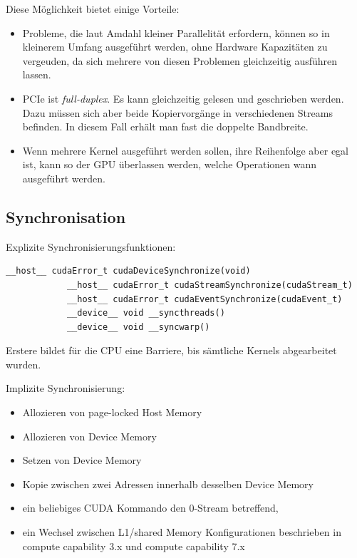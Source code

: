 		Diese Möglichkeit bietet einige Vorteile:
		\begin{itemize}
		\item Probleme, die laut Amdahl kleiner Parallelität erfordern, können so in kleinerem Umfang ausgeführt werden, ohne Hardware Kapazitäten zu vergeuden, da sich mehrere von diesen Problemen gleichzeitig ausführen lassen.
		\item PCIe ist \textit{full-duplex}. Es kann gleichzeitig gelesen und geschrieben werden. Dazu müssen sich aber beide Kopiervorgänge in verschiedenen Streams befinden. In diesem Fall erhält man fast die doppelte Bandbreite.
		\item Wenn mehrere \Gls{Kernel} ausgeführt werden sollen, ihre Reihenfolge aber egal ist, kann so der GPU überlassen werden, welche Operationen wann ausgeführt werden.
		\end{itemize}
		
		
		\subsection{Synchronisation}\label{sync}
		Explizite Synchronisierungsfunktionen:
		
		\begin{lstlisting}[caption=Explizite Synchronisierung]
			__host__ cudaError_t cudaDeviceSynchronize(void)
			__host__ cudaError_t cudaStreamSynchronize(cudaStream_t)
			__host__ cudaError_t cudaEventSynchronize(cudaEvent_t)	
			__device__ void __syncthreads()
			__device__ void __syncwarp()
		\end{lstlisting}
		Erstere bildet für die CPU eine Barriere, bis sämtliche Kernels abgearbeitet wurden.
		
		Implizite Synchronisierung:
		\begin{itemize}
        	    \item Allozieren von page-locked Host Memory 
			\item Allozieren von Device Memory
			\item Setzen von Device Memory 
			\item Kopie zwischen zwei Adressen innerhalb desselben Device Memory
			\item ein beliebiges CUDA Kommando den 0-\Gls{Stream} betreffend,
			\item ein Wechsel zwischen L1/\gls{shared Memory} Konfigurationen beschrieben in \gls{compute capability} 3.x und \gls{compute capability} 7.x
		\end{itemize}
		
